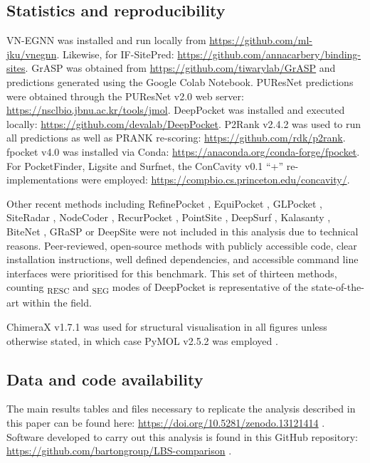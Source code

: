 \subsection{Statistics and reproducibility}

VN-EGNN was installed and run locally from \url{https://github.com/ml-jku/vnegnn}. Likewise, for IF-SitePred: \url{https://github.com/annacarbery/binding-sites}. GrASP was obtained from \url{https://github.com/tiwarylab/GrASP} and predictions generated using the Google Colab Notebook. PUResNet predictions were obtained through the PUResNet v2.0 web server: \url{https://nsclbio.jbnu.ac.kr/tools/jmol}. DeepPocket was installed and executed locally: \url{https://github.com/devalab/DeepPocket}. P2Rank v2.4.2 was used to run all predictions as well as PRANK re-scoring: \url{https://github.com/rdk/p2rank}. fpocket v4.0 was installed via Conda: \url{https://anaconda.org/conda-forge/fpocket}. For PocketFinder, Ligsite and Surfnet, the ConCavity v0.1 ``+'' re-implementations were employed: \url{https://compbio.cs.princeton.edu/concavity/}.

Other recent methods including RefinePocket \cite{LIU_2023_REFINEPOCKET}, EquiPocket \cite{ZHANG_2024_EQUIPOCKET}, GLPocket \cite{LI_2023_GLPOCKET}, SiteRadar \cite{EVTEEV_2023_SITERADAR}, NodeCoder \cite{ABDOLLAHI_2023_NODECODER}, RecurPocket \cite{LI_2022_RECURPOCKET}, PointSite \cite{YAN_2022_POINTSITE}, DeepSurf \cite{MYOLNAS_2021_DEEPSURF}, Kalasanty \cite{STEPNIEWSKA_2020_KALASANTY}, BiteNet \cite{KOZLOVSKII_2020_BITENET}, GRaSP \cite{SANTANA_2020_GRaSP} or DeepSite \cite{JIMENEZ_2017_DEEPSITE} were not included in this analysis due to technical reasons. Peer-reviewed, open-source methods with publicly accessible code, clear installation instructions, well defined dependencies, and accessible command line interfaces were prioritised for this benchmark. This set of thirteen methods, counting \textsubscript{RESC} and \textsubscript{SEG} modes of DeepPocket is representative of the state-of-the-art within the field.

ChimeraX v1.7.1 \cite{PETTERSEN_2021_CHIMERAX} was used for structural visualisation in all figures unless otherwise stated, in which case PyMOL v2.5.2 was employed \cite{SCHRODINGER_2015_PYMOL}.

\subsection{Data and code availability}

The main results tables and files necessary to replicate the analysis described in this paper can be found here: \url{https://doi.org/10.5281/zenodo.13121414} \cite{UTGES_2024_LBSCOMP_ZENODO}. Software developed to carry out this analysis is found in this GitHub repository: \url{https://github.com/bartongroup/LBS-comparison} \cite{UTGES_2024_LBSCOMP_REPO}.

